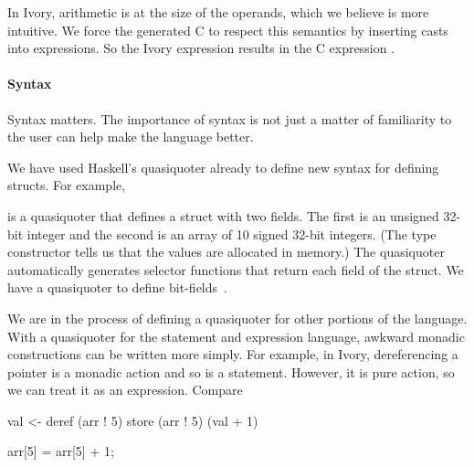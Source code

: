 In Ivory, arithmetic is at the size of the operands, which we believe is more
intuitive.  We force the generated C to respect this semantics by inserting
casts into expressions.  So the Ivory expression  results in the C
expression .

\paragraph{Syntax}
Syntax matters.  The importance of syntax is not just a matter of familiarity to
the user can help make the language better.

We have used Haskell's quasiquoter already to define new syntax
for defining structs.  For example,
\begin{code}
\end{code}
\noindent
is a quasiquoter that defines a struct  with two fields.  The first is
an unsigned 32-bit integer and the second is an array of 10 signed 32-bit
integers.  (The  type constructor tells us that the values are
allocated in memory.)  The quasiquoter automatically generates selector
functions that return each field of the struct.  We have a quasiquoter to define
bit-fields~\cite{high-level}.

We are in the process of defining a quasiquoter for other portions of the
language.  With a quasiquoter for the statement and expression language, awkward
monadic constructions can be written more simply.  For example, in Ivory,
dereferencing a pointer is a monadic action and so is a statement.  However, it
is pure action, so we can treat it as an expression.  Compare


\begin{code}
val <- deref (arr ! 5)
store (arr ! 5) (val + 1)
\end{code}

\begin{code}
arr[5] = arr[5] + 1;
\end{code}









